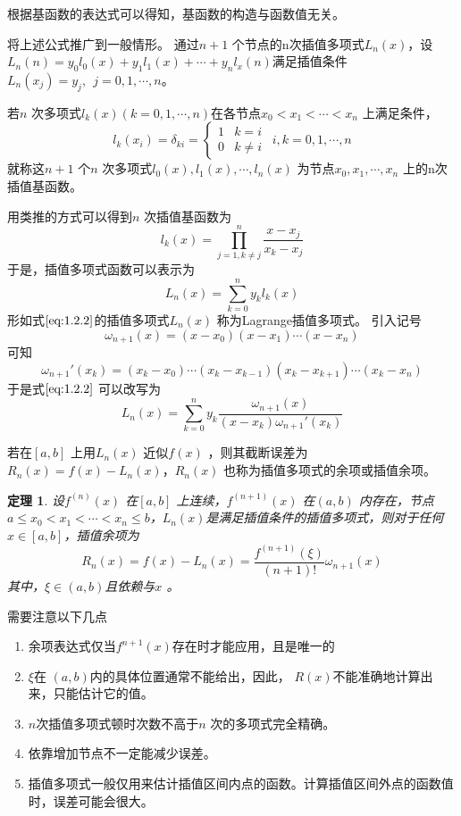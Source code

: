 \documentclass[a4paper]{article}
\begin{document}
根据基函数的表达式可以得知，基函数的构造与函数值无关。

将上述公式推广到一般情形。
通过$n+1$ 个节点的n次插值多项式$L_n(x)$，设$L_n(n) = y_0l_0(x) + y_1l_1(x) + \cdots + y_{n}l_{x}(n)$满足插值条件$L_n(x_j) = y_j, \ \ j = 0,1,\cdots,n$。
\begin{definition}
若$n$ 次多项式$l_k(x)(k=0,1,\cdots,n)$在各节点$x_0 < x_1 < \cdots < x_n$ 上满足条件，
\[
	l_k(x_{i}) = \delta_{ki} = \begin{cases}
		1 & k = i \\
		0 & k \neq i
	\end{cases} \ \ i,k = 0,1,\cdots,n \tag{1.2.1} \label{eq:1.2.1}
\] 
就称这$n+1$ 个$n$ 次多项式$l_0(x), l_1(x), \cdots, l_n(x)$ 为节点$x_0, x_1, \cdots, x_{n}$ 上的n次插值基函数。
\end{definition}
用类推的方式可以得到$n$ 次插值基函数为
\[
	l_k(x) = \prod_{j=1, k \neq j}^{n} \frac{x - x_{j}}{x_{k} - x_{j}} 
\] 
于是，插值多项式函数可以表示为
\[
	L_n(x) = \sum_{k=0}^{n} y_k l_k(x) \tag{1.2.2} \label{eq:1.2.2}
\] 
形如式$\ref{eq:1.2.2}$的插值多项式$L_n(x)$ 称为Lagrange插值多项式。
引入记号
\[
	\omega_{n+1}(x) = (x - x_0)(x - x_1)\cdots(x - x_{n})
\] 
可知
\[
	\omega_{n+1}'(x_{k}) = (x_k - x_0) \cdots (x_k - x_{k-1})(x_k - x_{k+1}) \cdots (x_k - x_{n})
\] 
于是式$\ref{eq:1.2.2}$ 可以改写为
\[
	L_n(x) = \sum_{k=0}^{n} y_k \frac{\omega_{n+1}(x)}{(x-x_k)\omega_{n+1}'(x_k)}
\]

若在$[a,b]$ 上用$L_n(x)$ 近似$f(x)$ ，则其截断误差为$R_n(x) = f(x) - L_n(x)$，$R_n(x)$ 也称为插值多项式的余项或插值余项。
\newtheorem{theorem}{定理}
\begin{theorem}
	设$f^{(n)}(x)$ 在$[a,b]$ 上连续，$f^{(n+1)}(x)$ 在$(a,b)$ 内存在，节点$a \le x_0 < x_1 < \cdots < x_n \le b $，$L_n(x)$是满足插值条件的插值多项式，则对于任何$x \in [a,b]$，插值余项为
	 \[
		 R_n(x) = f(x) - L_n(x) = \frac{f^{(n+1)}(\xi)}{(n+1)!}\omega_{n+1}(x) \tag{2.4} \label{2.4}
	\] 
	其中，$\xi \in (a,b)$且依赖与$x$ 。
\end{theorem}
需要注意以下几点
\begin{enumerate}
	\item 余项表达式仅当$f^{n+1}(x)$存在时才能应用，且是唯一的
	\item $\xi$在 $(a,b)$内的具体位置通常不能给出，因此， $R(x)$不能准确地计算出来，只能估计它的值。
	\item $n$次插值多项式顿时次数不高于$n$ 次的多项式完全精确。
	\item 依靠增加节点不一定能减少误差。
	\item 插值多项式一般仅用来估计插值区间内点的函数。计算插值区间外点的函数值时，误差可能会很大。
\end{enumerate}	
\end{document}
